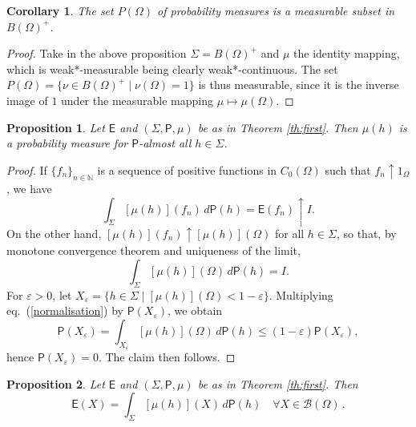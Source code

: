 \documentclass[12pt]{amsart}
\newtheorem{proposition}{Proposition}
\newtheorem{corollary}{Corollary}
\theoremstyle{definition}
\newcommand{\N}{\mathbb N} %
\newcommand{\Eo}{\mathsf{E}} %
\newcommand{\PP}{\mathsf{P}} %
\newcommand{\bor}[1]{\mathcal{B}(#1)} %
\newcommand{\de}{\, d}
\begin{document}
\begin{corollary}\label{Prop. misurab. di P}
The set $P(\Omega)$ of probability measures is a measurable subset in $B(\Omega)^+$.
\end{corollary}

\begin{proof}
Take in the above proposition $\Sigma = B(\Omega)^+$ and $\mu$ the identity mapping, which is weak*-measurable being clearly weak*-continuous. The set $P(\Omega) = \{ \nu \in B(\Omega)^+ \mid \nu (\Omega) = 1 \}$ is thus measurable, since it is the inverse image of $1$ under the measurable mapping $\mu \mapsto \mu (\Omega)$.
\end{proof}

\begin{proposition}\label{Prop. supp. di P}
Let $\Eo$ and $(\Sigma, \PP, \mu)$ be as in Theorem \ref{th:first}. Then $\mu (h)$ is a probability measure for $\PP$-almost all $h\in\Sigma$.
\end{proposition}

\begin{proof}
If $\{ f_n \}_{n\in\N}$ is a sequence of positive functions in $C_0 (\Omega)$ such that $f_n \uparrow 1_{\Omega}$, we have
\begin{equation*}
\int_\Sigma [\mu (h)] (f_n) \de \PP (h) = \Eo(f_n) \uparrow I .
\end{equation*}
On the other hand, $[\mu (h)] (f_n) \uparrow [\mu (h)] (\Omega)$ for all $h\in\Sigma$, so that, by monotone convergence theorem and uniqueness of the limit,
\begin{equation}\label{normalisation}
\int_\Sigma [\mu (h)] (\Omega) \de \PP (h) = I .
\end{equation}
For $\varepsilon > 0$, let $X_\varepsilon = \{ h\in \Sigma \mid [\mu (h)] (\Omega) < 1 - \varepsilon \}$. Multiplying eq.~(\ref{normalisation}) by $\PP (X_\varepsilon)$, we obtain
\begin{equation*}
\PP (X_\varepsilon) = \int_{X_\varepsilon} [\mu (h)] (\Omega) \de \PP (h) \leq ( 1 - \varepsilon ) \PP (X_\varepsilon) ,
\end{equation*}
hence $\PP (X_\varepsilon) = 0$. The claim then follows.
\end{proof}

\begin{proposition}\label{caratt. di E sui Borel}
Let $\Eo$ and $(\Sigma, \PP, \mu)$ be as in Theorem \ref{th:first}. Then
\begin{equation}\label{eq:borel}
\Eo (X) = \int_\Sigma [\mu(h)] (X) \de \PP (h) \quad \forall X\in\bor{\Omega} \, .
\end{equation}
\end{proposition}
\end{document}
